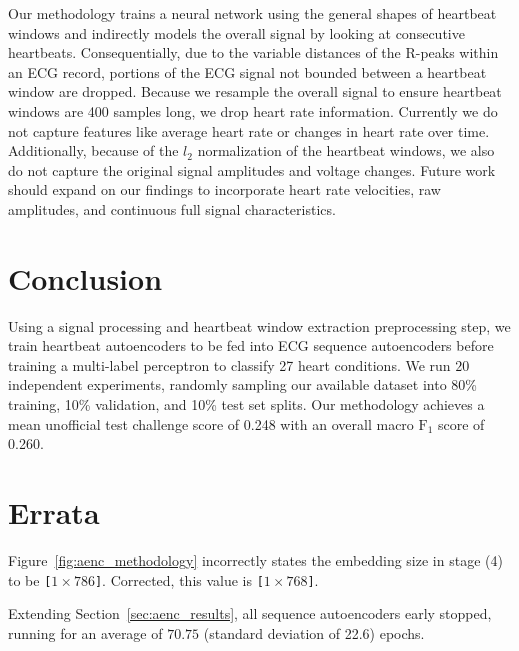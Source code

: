 \documentclass[\main/thesis.tex]{subfiles}
\begin{document}
Our methodology trains a neural network using the general shapes of heartbeat windows and indirectly models the overall signal by looking at consecutive heartbeats.
Consequentially, due to the variable distances of the R-peaks within an ECG record, portions of the ECG signal not bounded between a heartbeat window are dropped.
Because we resample the overall signal to ensure heartbeat windows are 400 samples long, we drop heart rate information.
Currently we do not capture features like average heart rate or changes in heart rate over time.
Additionally, because of the $l_2$ normalization of the heartbeat windows, we also do not capture the original signal amplitudes and voltage changes.
Future work should expand on our findings to incorporate heart rate velocities, raw amplitudes, and continuous full signal characteristics.

\section{Conclusion}

Using a signal processing and heartbeat window extraction preprocessing step, we train heartbeat autoencoders to be fed into ECG sequence autoencoders before training a multi-label perceptron to classify 27 heart conditions.
We run $20$ independent experiments, randomly sampling our available dataset into 80\% training, 10\% validation, and 10\% test set splits.
Our methodology achieves a mean unofficial test challenge score of 0.248 with an overall macro $\text{F}_1$ score of 0.260.

\section*{Errata}
Figure~\ref{fig:aenc_methodology} incorrectly states the embedding size in stage (4) to be \texttt{[$ 1 \times 786$]}.
Corrected, this value is \texttt{[$1 \times 768$]}.

Extending Section~\ref{sec:aenc_results}, all sequence autoencoders early stopped, running for an average of $70.75$ (standard deviation of 22.6) epochs.
\end{document}
